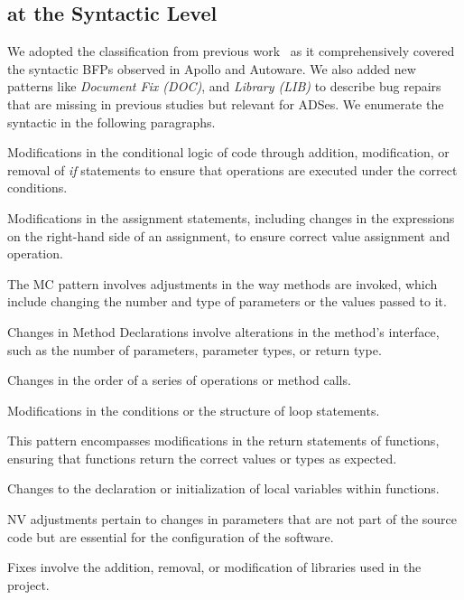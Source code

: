 \subsection{\BFPs at the Syntactic Level}
\label{subsec:syntactic_taxonomy}

We adopted the classification from previous work~\cite{PanKW09,IslamZ20} as it comprehensively covered the syntactic BFPs observed in Apollo and Autoware. We also added new patterns like  \textit{Document Fix (DOC)}, and \textit{Library (LIB)} to describe bug repairs that are missing in previous studies but relevant for ADSes. We enumerate the syntactic \bfps in the following paragraphs.

Modifications in the conditional logic of code through addition, modification, or removal of \textit{if} statements to ensure that operations are executed under the correct conditions.

Modifications in the assignment statements, including changes in the expressions on the right-hand side of an assignment, to ensure correct value assignment and operation.

The MC pattern involves adjustments in the way methods are invoked, which include changing the number and type of parameters or the values passed to it.

Changes in Method Declarations involve alterations in the method's interface, such as the number of parameters, parameter types, or return type. 

Changes in the order of a series of operations or method calls. 

Modifications in the conditions or the structure of loop statements. 

This pattern encompasses modifications in the return statements of functions, ensuring that functions return the correct values or types as expected.

Changes to the declaration or initialization of local variables within functions. 

NV adjustments pertain to changes in parameters that are not part of the source code but are essential for the configuration of the software.

Fixes involve the addition, removal, or modification of libraries used in the project. 

